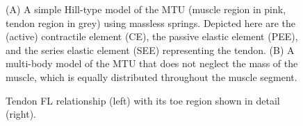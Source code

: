\documentclass{sfuthesis}
\numberwithin{equation}{section}
\numberwithin{figure}{chapter}
\numberwithin{table}{chapter}
\theoremstyle{definition}
\begin{document}
\begin{figure}
    \caption{(A) A simple Hill-type model of the MTU (muscle region in pink, tendon region in grey) using massless springs. Depicted here are the (active) contractile element (CE), the passive elastic element (PEE), and the series elastic element (SEE) representing the tendon. (B) A multi-body model of the MTU that does not neglect the mass of the muscle, which is equally distributed throughout the muscle segment.}
    \label{fig:muscle_models_1D}
\end{figure}

\begin{figure}
    \centering
    \caption{Tendon FL relationship (left) with its toe region shown in detail (right). \label{fig:plot_FT}}
\end{figure}

    
    
\end{document}

